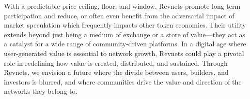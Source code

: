 \documentclass{article}
\begin{document}
With a predictable price ceiling, floor, and window, Revnets promote long-term participation and reduce, or often even benefit from the adversarial impact of market speculation which frequently impacts other token economies. Their utility extends beyond just being a medium of exchange or a store of value---they act as a catalyst for a wide range of community-driven platforms. In a digital age where user-generated value is essential to network growth, Revnets could play a pivotal role in redefining how value is created, distributed, and sustained. Through Revnets, we envision a future where the divide between users, builders, and investors is blurred, and where communities drive the value and direction of the networks they belong to.
\end{document}
